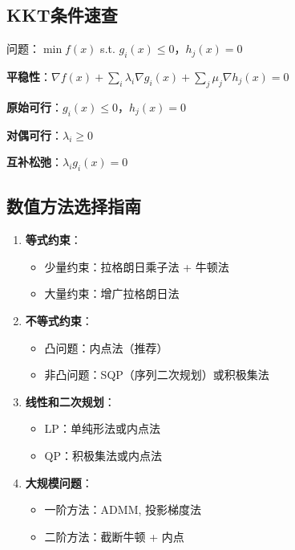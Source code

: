 \subsection{KKT条件速查}

\begin{kktbox}[标准形式NLP的KKT条件]
问题：$\min f(x)$ s.t. $g_i(x) \leq 0$，$h_j(x) = 0$

\textbf{平稳性}：$\nabla f(x) + \sum_i \lambda_i \nabla g_i(x) + \sum_j \mu_j \nabla h_j(x) = 0$

\textbf{原始可行}：$g_i(x) \leq 0$，$h_j(x) = 0$

\textbf{对偶可行}：$\lambda_i \geq 0$

\textbf{互补松弛}：$\lambda_i g_i(x) = 0$
\end{kktbox}

\subsection{数值方法选择指南}

\begin{conceptbox}[约束优化方法选择]
\begin{enumerate}
    \item \textbf{等式约束}：
    \begin{itemize}
        \item 少量约束：拉格朗日乘子法 + 牛顿法
        \item 大量约束：增广拉格朗日法
    \end{itemize}
    
    \item \textbf{不等式约束}：
    \begin{itemize}
        \item 凸问题：内点法（推荐）
        \item 非凸问题：SQP（序列二次规划）或积极集法
    \end{itemize}
    
    \item \textbf{线性和二次规划}：
    \begin{itemize}
        \item LP：单纯形法或内点法
        \item QP：积极集法或内点法
    \end{itemize}
    
    \item \textbf{大规模问题}：
    \begin{itemize}
        \item 一阶方法：ADMM, 投影梯度法
        \item 二阶方法：截断牛顿 + 内点
    \end{itemize}
\end{enumerate}
\end{conceptbox}

